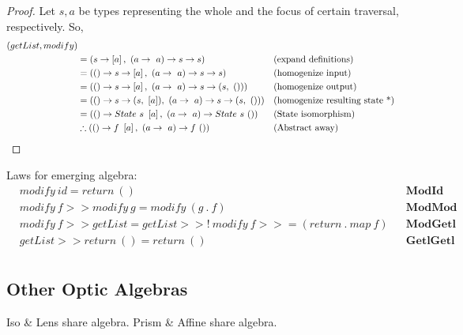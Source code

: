 \documentclass[a4paper]{article}
\begin{document}

\begin{proof}
  Let $s, a$ be types representing the whole and the focus of certain traversal,
  respectively. So,
  \begin{align*}
    (getList, modify) \\
    &= (s \rightarrow \left[a\right],\ (a \rightarrow\ a) \rightarrow s \rightarrow s) &&\text{(expand definitions)} \\
    &= (() \rightarrow s \rightarrow \left[a\right],\ (a \rightarrow\ a) \rightarrow s \rightarrow s) &&\text{(homogenize input)} \\
    &= (() \rightarrow s \rightarrow \left[a\right],\ (a \rightarrow\ a) \rightarrow s \rightarrow (s,\ ())) &&\text{(homogenize output)} \\
    &= (() \rightarrow s \rightarrow (s,\ \left[a\right]),\ (a \rightarrow\ a) \rightarrow s \rightarrow (s,\ ())) &&\text{(homogenize resulting state *)} \\
    &= (() \rightarrow State\ s\ \left[a\right],\ (a \rightarrow\ a) \rightarrow State\ s\ ()) &&\text{(State isomorphism)} \\
    &\therefore (() \rightarrow f\ \left[a\right],\ (a \rightarrow\ a) \rightarrow f\ ()) &&\text{(Abstract away)}\qedhere
  \end{align*}
\end{proof}

Laws for emerging algebra:
\begin{align*}
  & modify\ id = return\ () &&\textbf{ModId} \\
  & modify\ f >> modify\ g = modify\ (g\ .\ f) &&\textbf{ModMod} \\
  & modify\ f >> getList = getList >>!\ modify\ f >>= (return\ .\ map\ f) &&\textbf{ModGetl} \\
  & getList >> return\ () = return\ () &&\textbf{GetlGetl} \\
\end{align*}

\subsection{Other Optic Algebras}

  Iso \& Lens share algebra. Prism \&
Affine share algebra.
\end{document}
